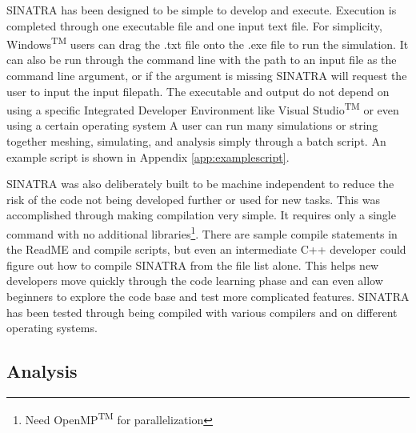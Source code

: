 SINATRA has been designed to be simple to develop and execute. Execution is completed through one executable file and one input text file. For simplicity, Windows\textsuperscript{TM} users can drag the .txt file onto the .exe file to run the simulation. It can also be run through the command line with the path to an input file as the command line argument, or if the argument is missing SINATRA will request the user to input the input filepath. The executable and output do not depend on using a specific Integrated Developer Environment like Visual Studio\textsuperscript{TM} or even using a certain operating system A user can run many simulations or string together meshing, simulating, and analysis simply through a batch script. An example script is shown in Appendix \ref{app:examplescript}. \par
\indent SINATRA was also deliberately built to be machine independent to reduce the risk of the code not being developed further or used for new tasks. This was accomplished through making compilation very simple. It requires only a single command with no additional libraries\footnote{Need OpenMP\textsuperscript{TM} for parallelization}. There are sample compile statements in the ReadME and compile scripts, but even an intermediate C++ developer could figure out how to compile SINATRA from the file list alone. This helps new developers move quickly through the code learning phase and can even allow beginners to explore the code base and test more complicated features. SINATRA has been tested through being compiled with various compilers and on different operating systems. 



\subsection{Analysis}


